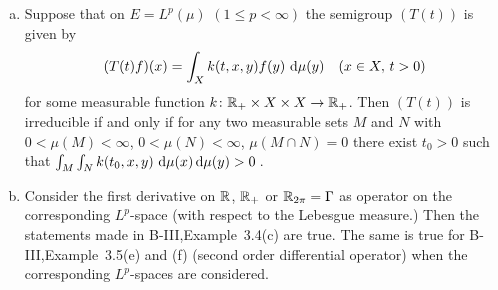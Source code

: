 \begin{examples}\label{ex:c3-3.4}
	\begin{enumerate}[(a), wide]
	\item 
	Suppose that on $E = L^{p}(\mu)$ $(1 \leq p < \infty)$ the semigroup $(T(t))$ is given by
	\begin{equation}\label{eq:c3-3.1}
		(T(t)f)(x) = \int_{X} k(t,x,y)f(y)\,\mathop{}\!\mathrm{d}{\mu}(y) \quad (x \in X,\, t > 0)
	\end{equation}
	for some measurable function $k \colon \mathbb{R} _{+} \times X \times X \to \mathbb{R} _{+}$.
	Then $(T(t))$ is irreducible if and only if for any two measurable sets $M$ and $N$ with $0 < \mu(M) < \infty$, $0 < \mu(N) < \infty$, $\mu(M\cap N) = 0$ there exist $t_{0} > 0$ such that $\int_{M}\int_{N} k(t_{0},x,y)\,\mathop{}\!\mathrm{d}{\mu}(x)\mathop{}\!\mathrm{d}{\mu}(y) > 0$\,.
	
	\item 
	Consider the first derivative on $\mathbb{R} $, $\mathbb{R} _{+}$ or $\mathbb{R} _{2\pi} = \Gamma$ as operator on the corresponding $L^{p}$-space (with respect to the Lebesgue measure.)
	Then the statements made in B-III,Example~3.4(c) are true.
	The same is true for B-III,Example~3.5(e) and (f) (second order differential operator) when the corresponding $L^{p}$-spaces are considered.
	

\end{enumerate}
\end{examples}

